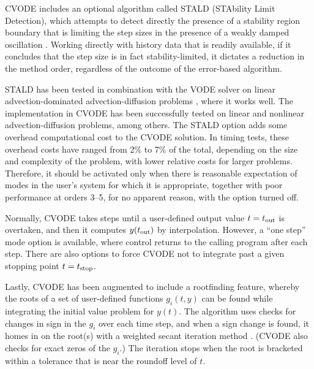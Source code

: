 CVODE includes an optional algorithm called STALD (STAbility Limit
Detection), which attempts to detect directly the presence of a
stability region boundary that is limiting the step sizes in the
presence of a weakly damped oscillation \cite{Hin:92}.  Working
directly with history data that is readily available, if it concludes
that the step size is in fact stability-limited, it dictates a
reduction in the method order, regardless of the outcome of the
error-based algorithm.

STALD has been tested in combination with the VODE solver on linear
advection-dominated advection-diffusion problems \cite{Hin:95}, where
it works well.  The implementation in CVODE has been successfully
tested on linear and nonlinear advection-diffusion problems, among others.
The STALD option adds some overhead computational cost to the CVODE
solution.  In timing tests, these overhead costs have ranged from 2\%
to 7\% of the total, depending on the size and complexity of the
problem, with lower relative costs for larger problems.  Therefore, it
should be activated only when there is reasonable expectation of modes
in the user's system for which it is appropriate, together with poor
performance at orders 3--5, for no apparent reason, with the option
turned off.

Normally, CVODE takes steps until a user-defined output value
$t = t_{\mbox{\scriptsize out}}$ is overtaken, and then it computes
$y(t_{\mbox{\scriptsize out}})$ by interpolation.  However, a
``one step'' mode option is available, where control returns to the
calling program after each step.  There are also options to force
CVODE not to integrate past a given stopping point
$t = t_{\mbox{\scriptsize stop}}$.

Lastly, CVODE has been augmented to include a rootfinding feature,
whereby the roots of a set of user-defined functions $g_i(t,y)$
can be found while integrating the initial value problem for
$y(t)$.  The algorithm uses checks for changes in sign in the
$g_i$ over each time step, and when a sign change is found, it
homes in on the root(s) with a weighted secant iteration method
\cite{HeSh:80}. (CVODE also checks for exact zeros of the $g_i$.)
The iteration stops when the root is bracketed within a tolerance
that is near the roundoff level of $t$.
